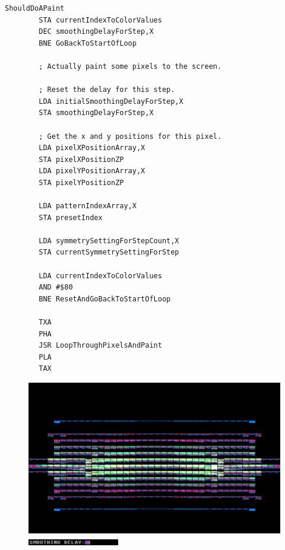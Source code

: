 \begin{lstlisting}[caption=From \icode{MainPaintLoop}.]
ShouldDoAPaint   
        STA currentIndexToColorValues
        DEC smoothingDelayForStep,X
        BNE GoBackToStartOfLoop

        ; Actually paint some pixels to the screen.

        ; Reset the delay for this step.
        LDA initialSmoothingDelayForStep,X
        STA smoothingDelayForStep,X

        ; Get the x and y positions for this pixel.
        LDA pixelXPositionArray,X
        STA pixelXPositionZP
        LDA pixelYPositionArray,X
        STA pixelYPositionZP

        LDA patternIndexArray,X
        STA presetIndex

        LDA symmetrySettingForStepCount,X
        STA currentSymmetrySettingForStep

        LDA currentIndexToColorValues
        AND #$80
        BNE ResetAndGoBackToStartOfLoop

        TXA 
        PHA 
        JSR LoopThroughPixelsAndPaint
        PLA 
        TAX 
\end{lstlisting}
\clearpage
\begin{figure}[H]
    \centering
    \begin{adjustbox}{width=10.5cm,margin=0cm}
      \includegraphics[width=12cm]{src/delay/pixelhist-0.png}%
    \end{adjustbox}
    \caption{
      \includegraphics[width=4cm]{src/delay/delay-low.png}%
      }
\end{figure}
